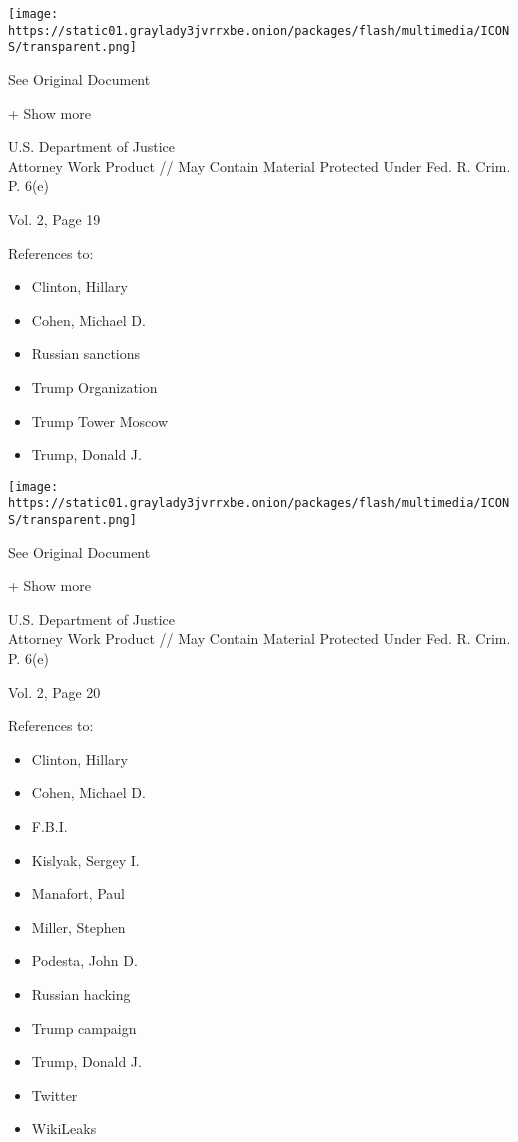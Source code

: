 \protect\hyperlink{}{}

\texttt{[image: https://static01.graylady3jvrrxbe.onion/packages/flash/multimedia/ICONS/transparent.png]}

See Original Document

+ Show more

U.S. Department of Justice\\
Attorney Work Product // May Contain Material Protected Under Fed. R.
Crim. P. 6(e)

Vol. 2, Page 19

References to:

\begin{itemize}
\tightlist
\item
  Clinton, Hillary
\item
  Cohen, Michael D.
\item
  Russian sanctions
\item
  Trump Organization
\item
  Trump Tower Moscow
\item
  Trump, Donald J.
\end{itemize}

\protect\hyperlink{}{}

\texttt{[image: https://static01.graylady3jvrrxbe.onion/packages/flash/multimedia/ICONS/transparent.png]}

See Original Document

+ Show more

U.S. Department of Justice\\
Attorney Work Product // May Contain Material Protected Under Fed. R.
Crim. P. 6(e)

Vol. 2, Page 20

References to:

\begin{itemize}
\tightlist
\item
  Clinton, Hillary
\item
  Cohen, Michael D.
\item
  F.B.I.
\item
  Kislyak, Sergey I.
\item
  Manafort, Paul 
\item
  Miller, Stephen
\item
  Podesta, John D.
\item
  Russian hacking
\item
  Trump campaign
\item
  Trump, Donald J.
\item
  Twitter
\item
  WikiLeaks
\end{itemize}

